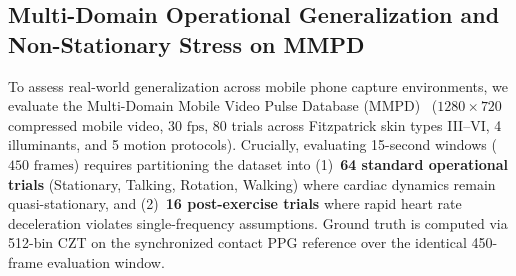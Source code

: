 \documentclass[conference]{IEEEtran}
\begin{document}
\subsection{Multi-Domain Operational Generalization and Non-Stationary Stress on MMPD}
\label{sec:mmpd}

To assess real-world generalization across mobile phone capture environments, we evaluate the Multi-Domain Mobile Video Pulse Database (MMPD)~\cite{tang2023mmpd} ($1280\times 720$ compressed mobile video, $30\text{ fps}$, 80 trials across Fitzpatrick skin types III--VI, 4 illuminants, and 5 motion protocols). Crucially, evaluating 15-second windows ($450\text{ frames}$) requires partitioning the dataset into (1)~\textbf{64 standard operational trials} (Stationary, Talking, Rotation, Walking) where cardiac dynamics remain quasi-stationary, and (2)~\textbf{16 post-exercise trials} where rapid heart rate deceleration violates single-frequency assumptions. Ground truth is computed via 512-bin CZT on the synchronized contact PPG reference over the identical 450-frame evaluation window.
\end{document}
